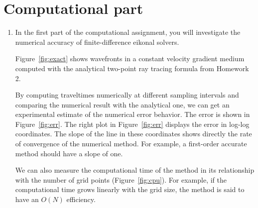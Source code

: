 \section{Computational part}

\begin{enumerate}

\item In the first part of the computational assignment, you will
  investigate the numerical accuracy of finite-difference eikonal solvers.

  
  Figure~\ref{fig:exact} shows wavefronts in a constant velocity
  gradient medium computed with the analytical two-point ray tracing
  formula from Homework 2.


  By computing traveltimes numerically at different sampling intervals
  and comparing the numerical result with the analytical one, we can
  get an experimental estimate of the numerical error behavior. The
  error is shown in Figure~\ref{fig:err}. The right plot in
  Figure~\ref{fig:err} displays the error in log-log coordinates. The
  slope of the line in these coordinates shows directly the rate of
  convergence of the numerical method. For example, a first-order
  accurate method should have a slope of one.


  We can also measure the computational time of the method in its
  relationship with the number of grid points (Figure~\ref{fig:cpu}).
  For example, if the computational time grows linearly with the grid
  size, the method is said to have an $O(N)$ efficiency.



\end{enumerate}
